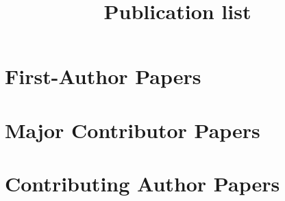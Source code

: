 % 

\title{Publication list}


\noindent



\section*{First-Author Papers}

\begin{etaremune}
    
\end{etaremune}


\section*{Major Contributor Papers}

\begin{etaremune}
    
\end{etaremune}


\section*{Contributing Author Papers}

\begin{etaremune}
    
\end{etaremune}






